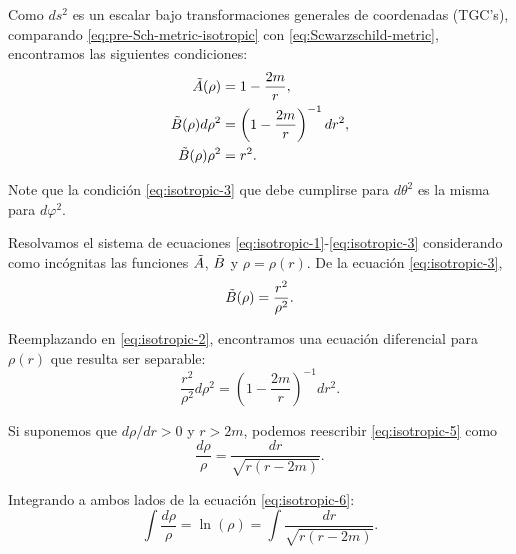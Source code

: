 \documentclass[letterpaper,11pt]{article}
\begin{document}
Como $ds^2$ es un escalar bajo transformaciones generales de coordenadas (TGC's), comparando \eqref{eq:pre-Sch-metric-isotropic} con \eqref{eq:Scwarzschild-metric}, encontramos  las siguientes condiciones:
\begin{align}
    \Tilde{A}(\rho) &= 1 - \frac{2m}{r}, \label{eq:isotropic-1}\\
    \Tilde{B}(\rho) d\rho^2 &= \left( 1 - \frac{2m}{r} \right)^{-1} dr^2, \label{eq:isotropic-2} \\
    \Tilde{B}(\rho) \rho^2 &= r^2. \label{eq:isotropic-3}
\end{align}

Note que la condición \eqref{eq:isotropic-3} que debe cumplirse para $d\theta^2$ es la misma para $d\varphi^2$.

Resolvamos el sistema de ecuaciones \eqref{eq:isotropic-1}-\eqref{eq:isotropic-3} considerando como incógnitas las funciones $\Tilde{A}$, $\Tilde{B}$ y $\rho = \rho(r)$. De la ecuación \eqref{eq:isotropic-3},
\begin{equation} \label{eq:isotropic-4}
    \Tilde{B}(\rho) =  \frac{r^2}{\rho^2}.
\end{equation}

Reemplazando en \eqref{eq:isotropic-2}, encontramos una ecuación diferencial para $\rho(r)$ que resulta ser separable:
\begin{equation} \label{eq:isotropic-5}
    \frac{r^2}{\rho^2} d\rho^2 = \left( 1 - \frac{2m}{r}\right)^{-1} dr^2.
\end{equation}

Si suponemos que $d\rho/dr > 0$ y $r > 2m$, podemos reescribir \eqref{eq:isotropic-5} como
\begin{equation} \label{eq:isotropic-6}
    \frac{d\rho}{\rho} = \frac{dr}{\sqrt{r(r-2m)}}.
\end{equation}

Integrando a ambos lados de la ecuación \eqref{eq:isotropic-6}:
\begin{equation}
    \int \frac{d\rho}{\rho} = \ln(\rho) = \int \frac{dr}{\sqrt{r(r-2m)}}. \label{eq:isotropic-7}
\end{equation}
\end{document}
